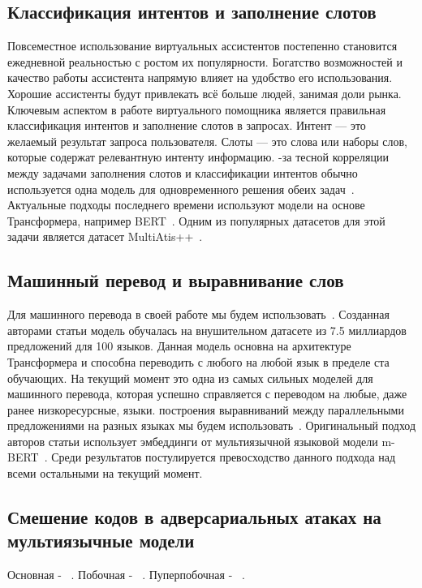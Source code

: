 \subsection{Классификация интентов и заполнение слотов}
Повсеместное использование виртуальных ассистентов постепенно становится ежедневной реальностью с ростом их популярности.
Богатство возможностей и качество работы ассистента напрямую влияет на удобство его использования.
Хорошие ассистенты будут привлекать всё больше людей, занимая доли рынка.
Ключевым аспектом в работе виртуального помощника является правильная классификация интентов и заполнение слотов в запросах.
Интент — это желаемый результат запроса пользователя.
Слоты — это слова или наборы слов, которые содержат релевантную интенту информацию.
-за тесной корреляции между задачами заполнения слотов и классификации интентов обычно используется одна модель для одновременного решения обеих задач~\cite{Weld2021ASO}.
Актуальные подходы последнего времени используют модели на основе Трансформера, например BERT~\cite{devlin-etal-2019-bert}.
Одним из популярных датасетов для этой задачи является датасет MultiAtis++~\cite{Xu2020EndtoEndSA}.

\subsection{Машинный перевод и выравнивание слов}
Для машинного перевода в своей работе мы будем использовать~\cite{Fan2020BeyondEM}.
Созданная авторами статьи модель обучалась на внушительном датасете из 7.5 миллиардов предложений для 100 языков.
Данная модель основна на архитектуре Трансформера и способна переводить с любого на любой язык в пределе ста обучающих.
На текущий момент это одна из самых сильных моделей для машинного перевода, которая успешно справляется с переводом на любые, даже ранее низкоресурсные, языки.
 построения выравниваний между параллельными предложениями на разных языках мы будем использовать~\cite{Dou2021WordAB}.
Оригинальный подход авторов статьи использует эмбеддинги от мультиязычной языковой модели m-BERT~\cite{devlin-etal-2019-bert}.
Среди результатов постулируется превосходство данного подхода над всеми остальными на текущий момент.

\subsection{Смешение кодов в адверсариальных атаках на мультиязычные модели}
Основная - ~\cite{Tan2021CodeMixingOS}.
Побочная - ~\cite{Krishnan2021MultilingualCF}.
Пуперпобочная - ~\cite{santy-etal-2021-bertologicomix}.

